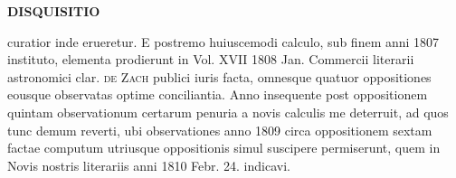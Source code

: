    
\fi
\setlength{\abovedisplayskip}{7pt}
\setlength{\belowdisplayskip}{7pt}
\setlength{\abovedisplayshortskip}{5pt}
\setlength{\belowdisplayshortskip}{5pt}
\setlength{\jot}{2pt}
\thispagestyle{empty}
\noindent{}%
%
\parbox[t]{\dimexpr\linewidth-24mm\relax}{\centering\footnotesize\bfseries DISQUISITIO\par}%
\makebox[12mm][r]{}\par\nobreak\medskip
\noindent curatior inde erueretur. E postremo huiuscemodi calculo, sub finem anni 1807 instituto, elementa prodierunt in Vol. XVII 1808 Jan. Commercii literarii astronomici clar. \textsc{de Zach} publici iuris facta, omnesque quatuor oppositiones eousque observatas optime conciliantia. Anno insequente post oppositionem quintam observationum certarum penuria a novis calculis me deterruit, ad quos tunc demum reverti, ubi observationes anno 1809 circa oppositionem sextam factae computum utriusque oppositionis simul suscipere permiserunt, quem in Novis nostris literariis anni 1810 Febr. 24. indicavi.

